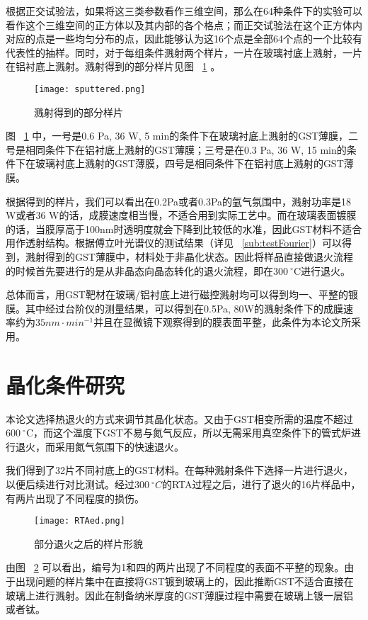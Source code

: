 根据正交试验法，如果将这三类参数看作三维空间，那么在64种条件下的实验可以看作这个三维空间的正方体以及其内部的各个格点；而正交试验法在这个正方体内对应的点是一些均匀分布的点，因此能够认为这16个点是全部64个点的一个比较有代表性的抽样。同时，对于每组条件溅射两个样片，一片在玻璃衬底上溅射，一片在铝衬底上溅射。溅射得到的部分样片见图 ~\ref{fig:sputtered} 。
\begin{figure}[H] %
  \centering
  \texttt{[image: sputtered.png]}
  \caption{溅射得到的部分样片}
  \label{fig:sputtered}
\end{figure}
图 ~\ref{fig:sputtered} 中，一号是0.6 Pa, 36 W, 5 min的条件下在玻璃衬底上溅射的GST薄膜，二号是相同条件下在铝衬底上溅射的GST薄膜；三号是在0.3 Pa, 36 W, 15 min的条件下在玻璃衬底上溅射的GST薄膜，四号是相同条件下在铝衬底上溅射的GST薄膜。

根据得到的样片，我们可以看出在0.2Pa或者0.3Pa的氩气氛围中，溅射功率是18 W或者36 W的话，成膜速度相当慢，不适合用到实际工艺中。而在玻璃表面镀膜的话，当膜厚高于100nm时透明度就会下降到比较低的水准，因此GST材料不适合用作透射结构。根据傅立叶光谱仪的测试结果（详见 ~\ref{sub:testFourier}）可以得到，溅射得到的GST薄膜中，材料处于非晶化状态。因此将样品直接做退火流程的时候首先要进行的是从非晶态向晶态转化的退火流程，即在300$\ ^{\circ}$C进行退火。

总体而言，用GST靶材在玻璃/铝衬底上进行磁控溅射均可以得到均一、平整的镀膜。其中经过台阶仪的测量结果，可以得到在0.5Pa, 80W的溅射条件下的成膜速率约为$35nm \cdot{} min^{-1}$并且在显微镜下观察得到的膜表面平整，此条件为本论文所采用。

\section{晶化条件研究}
\label{sec:RTA}
本论文选择热退火的方式来调节其晶化状态。又由于GST相变所需的温度不超过600$\ ^{\circ}$C，而这个温度下GST不易与氮气反应，所以无需采用真空条件下的管式炉进行退火，而采用氮气氛围下的快速退火。

我们得到了32片不同衬底上的GST材料。在每种溅射条件下选择一片进行退火，以便后续进行对比测试。经过300$\ ^{\circ}C$的RTA过程之后，进行了退火的16片样品中，有两片出现了不同程度的损伤。
\begin{figure}[H] %
  \centering
  \texttt{[image: RTAed.png]}
  \caption{部分退火之后的样片形貌}
  \label{fig:RTA}
\end{figure}
由图 ~\ref{fig:RTA} 可以看出，编号为1和四的两片出现了不同程度的表面不平整的现象。由于出现问题的样片集中在直接将GST镀到玻璃上的，因此推断GST不适合直接在玻璃上进行溅射。因此在制备纳米厚度的GST薄膜过程中需要在玻璃上镀一层铝或者钛。

